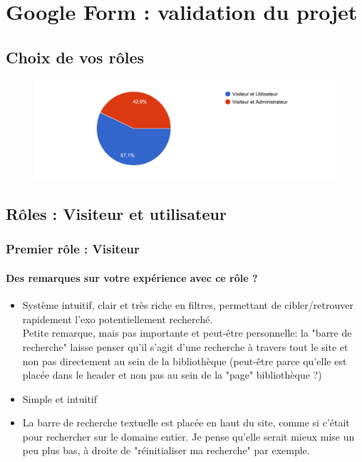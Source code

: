 \chapter{Google Form : validation du projet}

\section{Choix de vos rôles}

\begin{figure}[H]
    \includegraphics[width=\textwidth,height=0.3\textheight,keepaspectratio]{images/googleForm/roles.png}
    \centering
\end{figure}

\section{Rôles : Visiteur et utilisateur}

\subsection{Premier rôle : Visiteur}

\subsubsection*{Des remarques sur votre expérience avec ce rôle ?}

\begin{itemize}
    \item Système intuitif, clair et très riche en filtres, permettant de cibler/retrouver rapidement l'exo potentiellement recherché.\\
    Petite remarque, mais pas importante et peut-être personnelle: la "barre de recherche" laisse penser qu'il s'agit d'une recherche à travers tout le site et non pas directement au sein de la bibliothèque (peut-être parce qu'elle est placée dans le header et non pas au sein de la "page" bibliothèque ?)
    \item Simple et intuitif
    \item La barre de recherche textuelle est placée en haut du site, comme si c'était pour rechercher sur le domaine entier. Je pense qu'elle serait mieux mise un peu plus bas, à droite de "réinitialiser ma recherche" par exemple.
\end{itemize}

